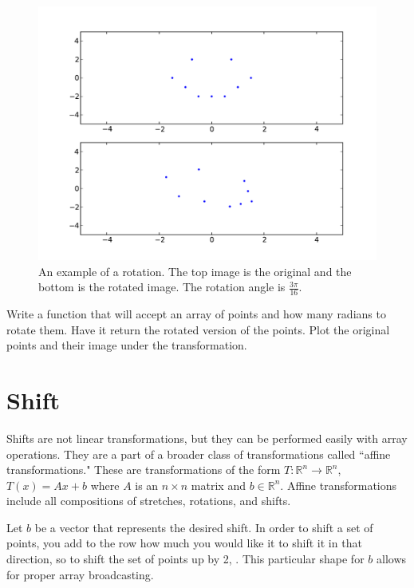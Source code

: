 \begin{figure}
\centering
\includegraphics[width=\textwidth]{rotate.pdf}
\caption{An example of a rotation.
The top image is the original and the bottom is the rotated image.
The rotation angle is $\frac{3\pi}{16}$.}
\end{figure}

\begin{problem}
Write a function that will accept an array of points and how many radians to rotate them.
Have it return the rotated version of the points.
Plot the original points and their image under the transformation.
\end{problem}

\section*{Shift}

Shifts are not linear transformations, but they can be performed easily with array operations.
They are a part of a broader class of transformations called ``affine transformations."
These are transformations of the form $T: \mathbb{R}^n \to \mathbb{R}^n$, $T(x) = A x + b$ where $A$ is an $n\times n$ matrix and $b \in \mathbb{R}^n$.
Affine transformations include all compositions of stretches, rotations, and shifts.

Let $b$ be a vector that represents the desired shift.
In order to shift a set of points, you add to the row how much you would like it to shift it in that direction, so to shift the set of points up by 2, .
This particular shape for $b$ allows for proper array broadcasting.

